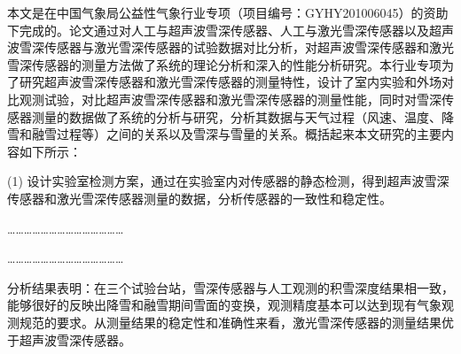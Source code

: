 \documentclass{cuitthesis}
\begin{document}
\makecuitcover

\cuitfrontmatter
\makecuitstatements

\begin{cuitabstractcn}
本文是在中国气象局公益性气象行业专项（项目编号：GYHY201006045）的资助下完成的。论文通过对人工与超声波雪深传感器、人工与激光雪深传感器以及超声波雪深传感器与激光雪深传感器的试验数据对比分析，对超声波雪深传感器和激光雪深传感器的测量方法做了系统的理论分析和深入的性能分析研究。本行业专项为了研究超声波雪深传感器和激光雪深传感器的测量特性，设计了室内实验和外场对比观测试验，对比超声波雪深传感器和激光雪深传感器的测量性能，同时对雪深传感器测量的数据做了系统的分析与研究，分析其数据与天气过程（风速、温度、降雪和融雪过程等）之间的关系以及雪深与雪量的关系。概括起来本文研究的主要内容如下所示：

(1) 设计实验室检测方案，通过在实验室内对传感器的静态检测，得到超声波雪深传感器和激光雪深传感器测量的数据，分析传感器的一致性和稳定性。

……………………………………

……………………………………

分析结果表明：在三个试验台站，雪深传感器与人工观测的积雪深度结果相一致，能够很好的反映出降雪和融雪期间雪面的变换，观测精度基本可以达到现有气象观测规范的要求。从测量结果的稳定性和准确性来看，激光雪深传感器的测量结果优于超声波雪深传感器。
\end{cuitabstractcn}
\end{document}

